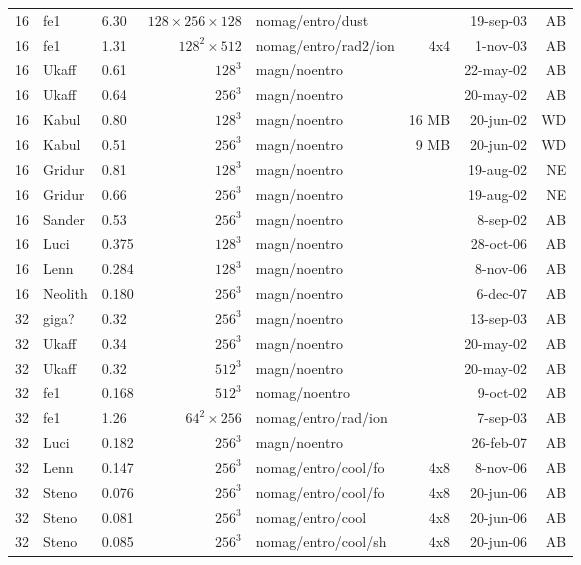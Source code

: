\documentclass[\mydriver,12pt,twoside,notitlepage,a4paper]{article}
\begin{document}
\begin{center}
\begin{small}
\begin{longtable}{rllrlrrr}
  16 & fe1   & 6.30 & $128\!\times\!256\!\times\!128$
                              & nomag/entro/dust &    & 19-sep-03 & AB \\
  16 & fe1   & 1.31 & $128^2{\times}512$
                     & nomag/entro/rad2/ion &  4x4   &  1-nov-03 & AB \\
  16 & Ukaff & 0.61 & $128^3$ & magn/noentro &        & 22-may-02 & AB \\
  16 & Ukaff & 0.64 & $256^3$ & magn/noentro &        & 20-may-02 & AB \\
  16 & Kabul & 0.80 & $128^3$ & magn/noentro &  16 MB & 20-jun-02 & WD \\
  16 & Kabul & 0.51 & $256^3$ & magn/noentro &   9 MB & 20-jun-02 & WD \\
  16 & Gridur& 0.81 & $128^3$ & magn/noentro &        & 19-aug-02 & NE \\
  16 & Gridur& 0.66 & $256^3$ & magn/noentro &        & 19-aug-02 & NE \\
  16 & Sander& 0.53 & $256^3$ & magn/noentro &        &  8-sep-02 & AB \\
  16 & Luci  & 0.375& $128^3$ & magn/noentro &        & 28-oct-06 & AB \\
  16 & Lenn  & 0.284& $128^3$ & magn/noentro &        &  8-nov-06 & AB \\
  16 &Neolith& 0.180& $256^3$ & magn/noentro &        &  6-dec-07 & AB \\
  32 & giga? & 0.32 & $256^3$ & magn/noentro &        & 13-sep-03 & AB \\
  32 & Ukaff & 0.34 & $256^3$ & magn/noentro &        & 20-may-02 & AB \\
  32 & Ukaff & 0.32 & $512^3$ & magn/noentro &        & 20-may-02 & AB \\
  32 & fe1   & 0.168& $512^3$ &nomag/noentro&        &  9-oct-02 & AB \\
  32 & fe1   & 1.26 & $64^2\times256$ &nomag/entro/rad/ion& & 7-sep-03 & AB \\
  32 & Luci  & 0.182& $256^3$ &magn/noentro &        & 26-feb-07 & AB \\
  32 & Lenn  & 0.147& $256^3$ &nomag/entro/cool/fo& 4x8 &  8-nov-06 & AB \\
  32 & Steno & 0.076& $256^3$ &nomag/entro/cool/fo& 4x8 & 20-jun-06 & AB \\
  32 & Steno & 0.081& $256^3$ &nomag/entro/cool& 4x8 & 20-jun-06 & AB \\
  32 & Steno & 0.085& $256^3$ &nomag/entro/cool/sh& 4x8 & 20-jun-06 & AB \\

\end{longtable}
\end{small}
\end{center}
\end{document}

